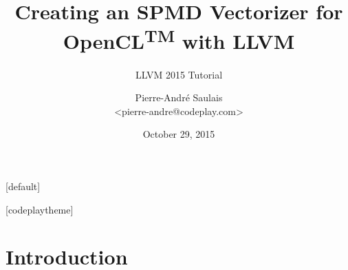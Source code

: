 \documentclass[t,aspectratio=169]{beamer}
\title{Creating an SPMD Vectorizer for OpenCL\textsuperscript{TM} with LLVM}
\subtitle{LLVM 2015 Tutorial}
\author{Pierre-André Saulais \\ <pierre-andre@codeplay.com>}
\institute{Codeplay Software \\ @codeplaysoft}
\date{October 29, 2015}
\begin{document}
[default]

\begin{frame}
  \vspace{4ex}
  \titlepage
\end{frame}


[codeplaytheme]

\section*{Introduction}
\end{document}
